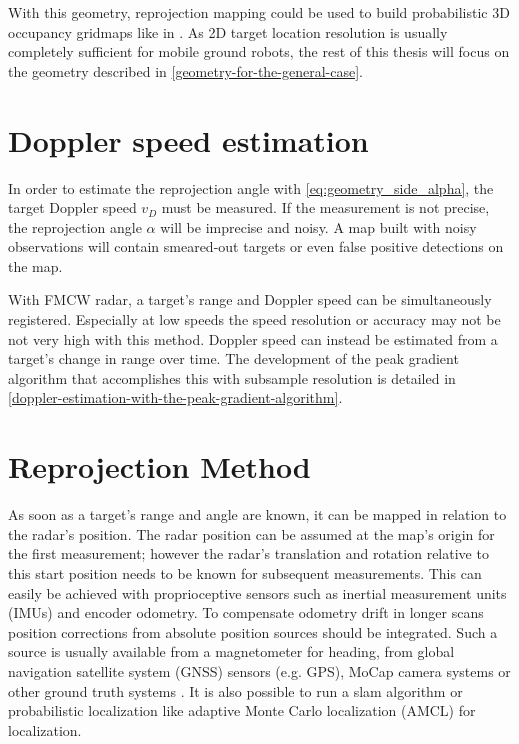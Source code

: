 With this geometry, reprojection mapping could be used to build probabilistic 3D occupancy gridmaps like in \cite{Hornung2013}. As 2D target location resolution is usually completely sufficient for mobile ground robots, the rest of this thesis will focus on the geometry described in \cref{geometry-for-the-general-case}.

\section{Doppler speed estimation}\label{doppler-speed-estimation}

In order to estimate the reprojection angle with \cref{eq:geometry_side_alpha}, the target Doppler speed $v_D$ must be measured. If the measurement is not precise, the reprojection angle \(\alpha\) will be imprecise and noisy. A map built with noisy observations will contain smeared-out targets or even false positive detections on the map.

With FMCW radar, a target's range and Doppler speed can be simultaneously registered. Especially at low speeds the speed resolution or accuracy may not be not very high with this method. Doppler speed can instead be estimated from a target's change in range over time. The development of the peak gradient algorithm that accomplishes this with subsample resolution is detailed in \cref{doppler-estimation-with-the-peak-gradient-algorithm}.

\section{Reprojection Method}\label{reprojection-method}

As soon as a target's range and angle are known, it can be mapped in relation
to the radar's position. The radar position can be assumed at the map's origin for the first measurement; however the radar's translation and rotation relative to this start position needs to be known for subsequent measurements. This can easily be achieved with proprioceptive sensors such as inertial measurement units (IMUs) and encoder odometry. To compensate odometry drift in longer scans position corrections from absolute position sources should be integrated. Such a source is usually available from a magnetometer for heading, from global navigation satellite system (GNSS) sensors (e.g. GPS), MoCap camera systems or other ground truth systems \cite{Godil2013}. It is also possible to run a slam algorithm or probabilistic localization like adaptive Monte Carlo localization (AMCL) for localization.

